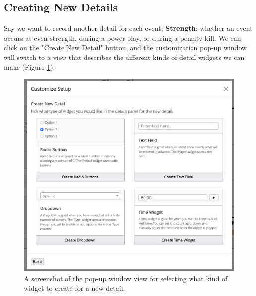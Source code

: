 \documentclass[letterpaper]{article}
\begin{document}
\subsection{Creating New Details}\label{create-column}
Say we want to record another detail for each event, \textbf{Strength}: whether an event occurs at even-strength, during a power play, or during a penalty kill. We can click on the "Create New Detail" button, and the customization pop-up window will switch to a view that describes the different kinds of detail widgets we can make (Figure \ref{fig:widget-select}).

\begin{figure}[h!]
			\centering
		\includegraphics[width=.9\linewidth]{images/widget-select}
	\caption{A screenshot of the pop-up window view for selecting what kind of widget to create for a new detail.}
	\label{fig:widget-select}
	\end{figure}
\end{document}
